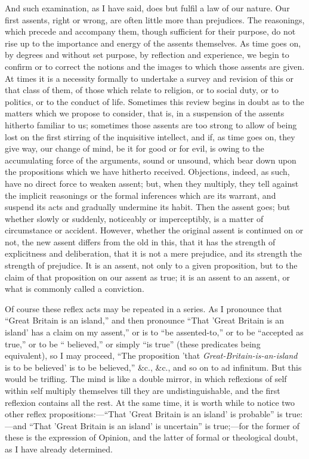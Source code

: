 And such examination, as I have said, does but fulfil a law of our
nature. Our first assents, right or wrong, are often little more than
prejudices. The reasonings, which precede and accompany them, though
sufficient for their purpose, do not rise up to the importance and
energy of the assents themselves. As time goes on, by degrees and
without set purpose, by reflection and experience, we begin to confirm
or to correct the notions and the images to which those assents are
given. At times it is a necessity formally to undertake a survey and
revision of this or that class of them, of those which relate to
religion, or to social duty, or to politics, or to the conduct of
life. Sometimes this review begins in doubt as to the matters which we
propose to consider, that is, in a suspension of the assents hitherto
familiar to us; sometimes those assents are too strong to allow of
being lost on the first stirring of the inquisitive intellect, and if,
as time goes on, they give way, our change of mind, be it for good or
for evil, is owing to the accumulating force of the arguments, sound
or unsound, which bear down upon the propositions which we have
hitherto received. Objections, indeed, as such, have no direct force
to weaken assent; but, when they multiply, they tell against the
implicit reasonings or the formal inferences which are its warrant,
and suspend its acts and gradually undermine its habit. Then the
assent goes; but whether slowly or suddenly, noticeably or
imperceptibly, is a matter of circumstance or accident. However,
whether the original assent is continued on or not, the new assent
differs from the old in this, that it has the strength of explicitness
and deliberation, that it is not a mere prejudice, and its strength
the strength of prejudice. It is an assent, not only to a given
proposition, but to the claim of that proposition on our assent as
true; it is an assent to an assent, or what is commonly called a
conviction.

Of course these reflex acts may be repeated in a series. As I
pronounce that ``Great Britain is an island,'' and then
pronounce ``That 'Great Britain is an island' has a claim on my
assent,'' or is to ``be assented-to,'' or to be
``accepted as true,'' or to be `` believed,'' or
simply ``is true'' (these predicates being equivalent), so I
may proceed, ``The proposition 'that \emph{Great-Britain-is-an-island}
is to be believed' is to be believed,'' \&c., \&c., and so
on to ad infinitum. But this would be trifling. The mind is like a
double mirror, in which reflexions of self within self multiply
themselves till they are undistinguishable, and the first reflexion
contains all the rest. At the same time, it is worth while to notice
two other reflex propositions:—``That 'Great Britain is an
island' is probable'' is true:—and ``That 'Great Britain is
an island' is uncertain'' is true;—for the former of these is
the expression of Opinion, and the latter of formal or theological
doubt, as I have already determined.


